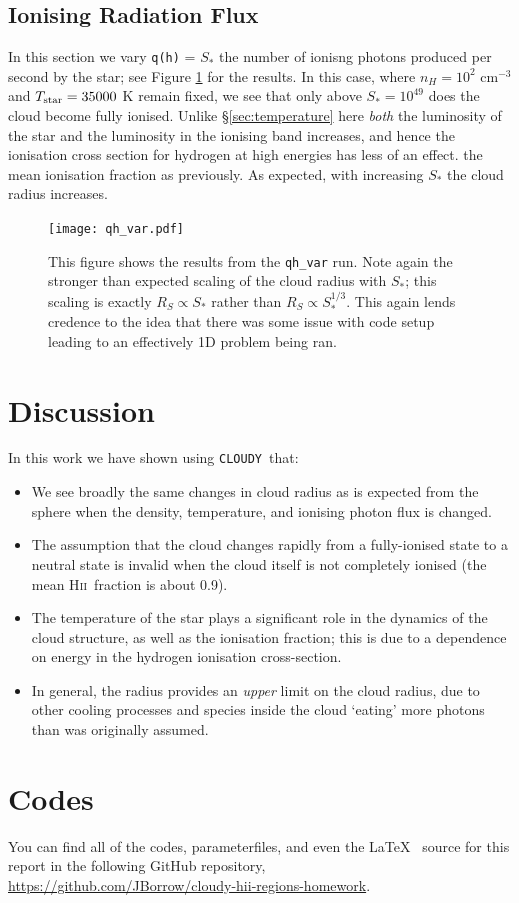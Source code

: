 \documentclass[a4paper]{article}
\newcommand{\hii}{H\textsc{ii}~}
\newcommand{\cloudy}{{\tt CLOUDY}~}
\begin{document}
\subsection{Ionising Radiation Flux}\label{sec:ionising}

In this section we vary {\tt q(h)} = $S_*$ the number of ionisng photons
produced per second by the star; see Figure \ref{fig:qhvar} for the results.
In this case, where $n_H = 10^2$ cm$^{-3}$ and $T_{\rm star} = 35000$ K remain
fixed, we see that only above $S_* = 10^{49}$ does the cloud become fully
ionised. Unlike §\ref{sec:temperature} here \emph{both} the luminosity of the
star and the luminosity in the ionising band increases, and hence the
ionisation cross section for hydrogen at high energies has less of an effect.
the mean ionisation fraction as previously. As expected, with increasing
$S_*$ the cloud radius increases.

\begin{figure}
    \centering
    \texttt{[image: qh\_var.pdf]}
    \caption{\small This figure shows the results from the {\tt qh\_var} run. Note
        again the stronger than expected scaling of the cloud radius with
        $S_*$; this scaling is exactly $R_S \propto S_*$ rather than
        $R_S \propto S_*^{1/3}$. This again lends credence to the idea that
        there was some issue with code setup leading to an effectively
        1D problem being ran.}
    \label{fig:qhvar}
\end{figure}

\section{Discussion}

In this work we have shown using \cloudy that:
\begin{itemize}
    \item We see broadly the same changes in cloud radius as is expected
          from the \citet{stromgren_physical_1939} sphere when the density,
          temperature, and ionising photon flux is changed.
    \item The assumption that the cloud changes rapidly from a fully-ionised
          state to a neutral state is invalid when the cloud itself is not
          completely ionised (the mean \hii fraction is about 0.9).
    \item The temperature of the star plays a significant role in the dynamics
          of the cloud structure, as well as the ionisation fraction; this is
          due to a dependence on energy in the hydrogen ionisation
          cross-section.
    \item In general, the \citet{stromgren_physical_1939} radius provides an
          \emph{upper} limit on the cloud radius, due to other cooling
          processes and species inside the cloud `eating' more photons than
          was originally assumed.
\end{itemize}

\section{Codes}

You can find all of the codes, parameterfiles, and even the \LaTeX~ source
for this report in the following GitHub repository,\\
\url{https://github.com/JBorrow/cloudy-hii-regions-homework}.


\end{document}
